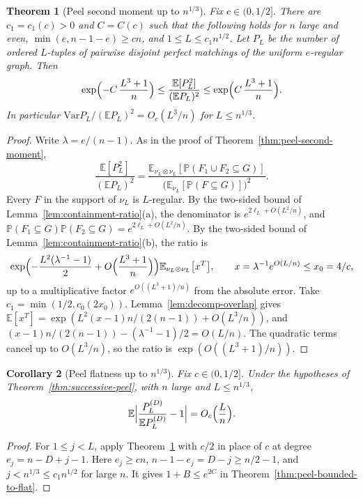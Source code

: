 \documentclass[11pt]{article}
\newtheorem{theorem}{Theorem}
\newtheorem{corollary}[theorem]{Corollary}
\newcommand{\EE}{\mathbb{E}}
\newcommand{\PP}{\mathbb{P}}
\newcommand{\Var}{\mathrm{Var}}
\begin{document}
\begin{theorem}[Peel second moment up to \(n^{1/3}\)]
\label{thm:peel-second-moment-third}
Fix \(c\in(0,1/2]\). There are \(c_1=c_1(c)>0\) and \(C=C(c)\) such that the
following holds for \(n\) large and even, \(\min(e,n-1-e)\ge cn\), and
\(1\le L\le c_1n^{1/2}\).
Let \(P_L\) be the number of ordered \(L\)-tuples of pairwise disjoint perfect
matchings of the uniform \(e\)-regular graph. Then
\[
\exp\Bigl(-C\,\frac{L^3+1}{n}\Bigr)
\le
\frac{\EE[P_L^2]}{(\EE P_L)^2}
\le
\exp\Bigl(C\,\frac{L^3+1}{n}\Bigr).
\]
In particular \(\Var P_L/(\EE P_L)^2=O_c(L^3/n)\) for \(L\le n^{1/3}\).
\end{theorem}

\begin{proof}
Write \(\lambda=e/(n-1)\).
As in the proof of Theorem~\ref{thm:peel-second-moment},
\[
\frac{\EE[P_L^2]}{(\EE P_L)^2}
=\frac{\EE_{\nu_L\otimes\nu_L}[\PP(F_1\cup F_2\subseteq G)]}
{\bigl(\EE_{\nu_L}[\PP(F\subseteq G)]\bigr)^2}.
\]
Every \(F\) in the support of \(\nu_L\) is \(L\)-regular.
By the two-sided bound of Lemma~\ref{lem:containment-ratio}(a), the
denominator is \(e^{2\ell_L+O(L^2/n)}\), and
\(\PP(F_1\subseteq G)\PP(F_2\subseteq G)=e^{2\ell_L+O(L^2/n)}\).
By the two-sided bound of Lemma~\ref{lem:containment-ratio}(b), the ratio is
\[
\exp\Bigl(-\frac{L^2(\lambda^{-1}-1)}2+O\Bigl(\frac{L^3+1}{n}\Bigr)\Bigr)
\EE_{\nu_L\otimes\nu_L}\bigl[x^T\bigr],
\qquad x=\lambda^{-1}e^{O(L/n)}\le x_0=4/c,
\]
up to a multiplicative factor \(e^{O((L^3+1)/n)}\) from the absolute error.
Take \(c_1=\min(1/2,c_0(2x_0))\).
Lemma~\ref{lem:decomp-overlap} gives
\(\EE[x^T]=\exp(L^2(x-1)n/(2(n-1))+O(L^3/n))\), and
\((x-1)n/(2(n-1))-(\lambda^{-1}-1)/2=O(L/n)\).
The quadratic terms cancel up to \(O(L^3/n)\), so the ratio is
\(\exp(O((L^3+1)/n))\).
\end{proof}

\begin{corollary}[Peel flatness up to \(n^{1/3}\)]
\label{cor:peel-flat-third}
Fix \(c\in(0,1/2]\).
Under the hypotheses of Theorem~\ref{thm:successive-peel}, with \(n\) large
and \(L\le n^{1/3}\),
\[
\EE\Bigl|\frac{P_L^{(D)}}{\EE P_L^{(D)}}-1\Bigr|=O_c\Bigl(\frac Ln\Bigr).
\]
\end{corollary}

\begin{proof}
For \(1\le j<L\), apply Theorem~\ref{thm:peel-second-moment-third} with
\(c/2\) in place of \(c\) at degree \(e_j=n-D+j-1\).
Here \(e_j\ge cn\), \(n-1-e_j=D-j\ge n/2-1\), and
\(j<n^{1/3}\le c_1n^{1/2}\) for large \(n\).
It gives \(1+B\le e^{2C}\) in Theorem~\ref{thm:peel-bounded-to-flat}.
\end{proof}
\end{document}
